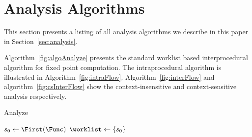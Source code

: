 \section{Analysis Algorithms}\label{app:algo}

This section presents a listing of all analysis algorithms
we describe in this paper in Section~\ref{sec:analysis}.

Algorithm~\ref{fig:algoAnalyze} presents the standard worklist
based interprocedural algorithm for fixed point computation.
The intraprocedural algorithm is illustrated in
Algorithm~\ref{fig:intraFlow}. Algorithm~\ref{fig:interFlow}
and algorithm~\ref{fig:csInterFlow} show the context-insensitive
and context-sensitive analysis respectively.

\IncMargin{1em}
\begin{algorithm}[!h]
\caption{Analyze}\label{fig:algoAnalyze}
\SetAlgoLined
\LinesNumbered
\DontPrintSemicolon
{}


\OutData{}
$ s_0 \leftarrow \First(\Func)$\;
$\worklist \leftarrow \set{s_0}$\;
\While{ $\worklist\ \neq\ \emptyset$ }{
	$\varI \leftarrow \Next(\worklist)$\;
	$\Output[i] \leftarrow \InterFlow(\AnalyzeAlgo, \varI)$\;
	\ForEach{ $\varJ \in \Succs(\varI)$ }{
		\If{ $\Output[\varI] \not\sqsubseteq \Input[\varJ]$}{
			$\Input[\varJ] \leftarrow \Input[\varJ] \sqcup \Output[\varI]$\;
			$\worklist \leftarrow \worklist \cup\ \set{\varJ}$\;
		}	
	}
}
\end{algorithm}
\DecMargin{1em}

\newpage

